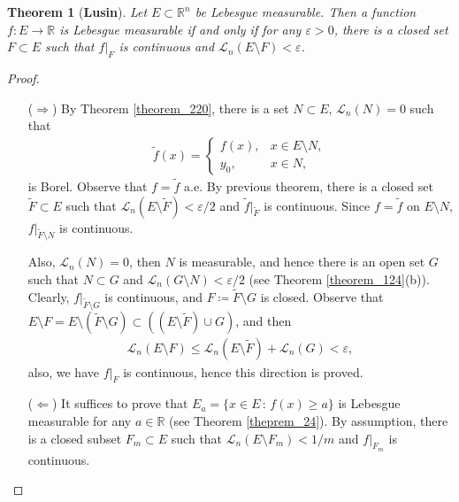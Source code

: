 \documentclass[11pt]{book}
\newtheorem{theorem}{Theorem}[chapter]
\theoremstyle{definition}
\numberwithin{equation}{chapter}
\begin{document}
\medskip

\begin{theorem}[{\bf Lusin}]
Let $E \subset \mathbb{R}^n$ be Lebesgue measurable. Then a function $f: E \to \mathbb{R}$ is Lebesgue measurable if and only if for any $\varepsilon > 0$, there is a closed set $F \subset E$ such that $f|_F$ is continuous and $\mathcal{L}_n(E \setminus F) < \varepsilon$.
\end{theorem}
\begin{proof}
~\begin{enumerate}
    \item[($\Rightarrow$)] By Theorem \ref{theorem_220}, there is a set $N \subset E$, $\mathcal{L}_n(N) = 0$ such that
    \begin{align*}
        \widetilde{f}(x) = \begin{cases}
            f(x), & x \in E \setminus N, \\
            y_0, & x \in N,
        \end{cases}
    \end{align*}
    is Borel. Observe that $f = \widetilde{f}$ a.e. By previous theorem, there is a closed set $\widetilde{F} \subset E$ such that $\mathcal{L}_n(E \setminus \widetilde{F}) < \varepsilon/2$ and $\widetilde{f}|_{\widetilde{F}}$ is continuous. Since $f = \widetilde{f}$ on $E \setminus N$, $f|_{\widetilde{F} \setminus N}$ is continuous.
    
    Also, $\mathcal{L}_n(N) = 0$, then $N$ is measurable, and hence there is an open set $G$ such that $N \subset G$ and $\mathcal{L}_n(G \setminus N) < \varepsilon/2$ (see Theorem \ref{theorem_124}(b)). Clearly, $f|_{\widetilde{F} \setminus G}$ is continuous, and $F \coloneqq \widetilde{F} \setminus G$ is closed. Observe that $E \setminus F = E \setminus (\widetilde{F} \setminus G) \subset ((E \setminus \widetilde{F}) \cup G)$, and then
    \begin{align*}
        \mathcal{L}_n(E \setminus F) \leq \mathcal{L}_n(E \setminus \widetilde{F}) + \mathcal{L}_n(G) < \varepsilon,
    \end{align*}
    also, we have $f|_F$ is continuous, hence this direction is proved.
    
    \item[($\Leftarrow$)] It suffices to prove that $E_a = \{x \in E \,:\, f(x) \geq a \}$ is Lebesgue measurable for any $a \in \mathbb{R}$ (see Theorem \ref{theprem_24}). By assumption, there is a closed subset $F_m \subset E$ such that $\mathcal{L}_n(E \setminus F_m) < 1/m$ and $f|_{F_m}$ is continuous. 
    

\end{enumerate}
\end{proof}
\end{document}
